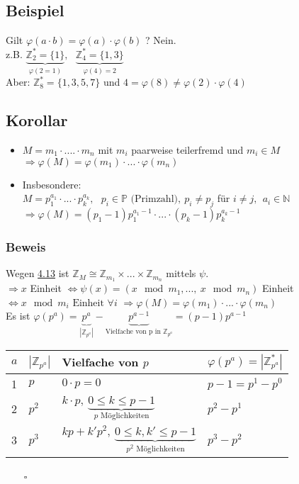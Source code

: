 \documentclass[12pt,titlepage, pdf]{article}
\newcommand{\qed}{\hfill$\square$}
\renewcommand{\>}{\rightarrow}
\renewcommand{\*}{\cdot}
\renewcommand{\phi}{\varphi}
\begin{document}
\subsection{Beispiel}
Gilt $\phi (a \cdot b) = \phi(a) \cdot \phi(b)$ ? Nein.\\
z.B. $\underbrace{\mathbb{Z}_2^* = \{1\}}_{\phi(2 = 1)},~~~ \underbrace{\mathbb{Z}_4^* = \{1,3\}}_{\phi(4)= 2}$\\
Aber: $\mathbb{Z}_8^* =\{1,3,5,7\}$ und $4 = \phi(8) \neq \phi(2) \cdot \phi(4)$
\subsection{Korollar}
\begin{itemize}
	\item$M = m_1 \cdot .... \cdot m_n$ mit $m_i$  paarweise teilerfremd und $m_i \in M$ \\
	$\Rightarrow \phi(M) =\phi(m_1) \cdot ... \cdot \phi(m_n)$
	\item Insbesondere:\\ $M = p_1^{a_1} \cdot... \cdot p_k^{a_k},~~~ p_i \in \mathbb{P}\textrm{ (Primzahl)},~ p_i \neq p_j$ für $i \neq j,~~ a_i \in \mathbb{N}$\\
	$\Rightarrow \phi(M) = (p_1 - 1)p_1^{a_1 - 1} \cdot ... \cdot (p_k - 1)p_k^{a_k - 1}$
\end{itemize}
\subsubsection*{Beweis}
Wegen \hyperref[4.13]{4.13} ist $\mathbb{Z}_M \cong \mathbb{Z}_{m_1} \times ... \times \mathbb{Z}_{m_n}$ mittels $\psi$.\\
$\Rightarrow x$ Einheit $\Leftrightarrow \psi(x)=(x\mod m_1,...,~x\mod m_n)$ Einheit\\
\noindent\hspace*{22mm}$\Leftrightarrow x \mod m_i \text{ Einheit } \forall i$
$\Rightarrow \phi(M) = \phi(m_1) \cdot ... \cdot \phi(m_n)$\\
Es ist $\phi(p^a) = \underbrace{p^a}_{|\mathbb{Z}_{p^a}|} - \underbrace{p^{a-1}}_{\text{Vielfache von p in }\mathbb{Z}_{p^a}} = (p-1)p^{a-1}$ \\
\begin{tabular}{l | l | l | l }
	$a$ & $|\mathbb{Z}_{p^a}|$ & Vielfache von $p$ & $\phi(p^a) = |\mathbb{Z}_{p^a}^*|$\\ \hline 
	1 & $p$ & $0 \cdot p = 0$ & $p-1 = p^1 - p^0$ \\
	2 & $p^2$ & $k\cdot p,~ \underbrace{0\leq k \leq p -1}_{p\text{ Möglichkeiten}}$ & $p^2 - p^1$ \\
	3 & $p^3$ & $kp + k'p^2,~ \underbrace{0 \leq k,k' \leq p-1}_{p^2\text{ Möglichkeiten}}$ & $p^3 - p^2$ \\
\end{tabular}~~~ \qed
\end{document}
